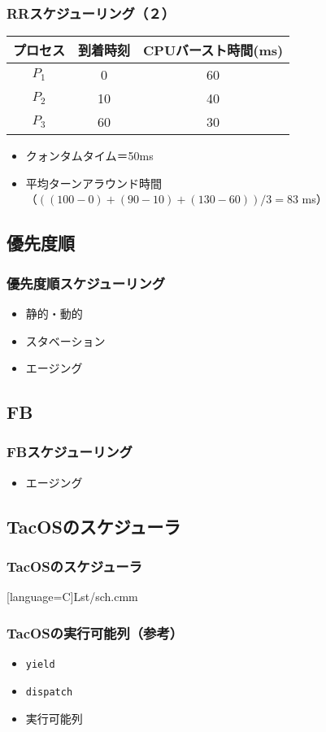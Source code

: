 \documentclass[dvipdfmx]{beamer}
\begin{document}
\begin{frame}
  \frametitle{RRスケジューリング（２）}
  \small\begin{tabular}{c c c}
    プロセス & 到着時刻 & CPUバースト時間(ms) \\
    \hline
    $P_1$    & 0  & 60 \\
    $P_2$    & 10 & 40 \\
    $P_3$    & 60 & 30 \\
  \end{tabular}
  \begin{itemize}
    \item クォンタムタイム＝50ms
    \item 平均ターンアラウンド時間\\
      （$((100-0)+(90-10)+(130-60))/3=83$ ms）
  \end{itemize}
\end{frame}

\subsection{優先度順}
\begin{frame}
  \frametitle{優先度順スケジューリング}
  \begin{itemize}
    \item 静的・動的
    \item スタベーション
    \item エージング
  \end{itemize}
\end{frame}


\subsection{FB}
\begin{frame}
  \frametitle{FBスケジューリング}
  \begin{itemize}
    \item エージング
  \end{itemize}
\end{frame}

\subsection{TacOSのスケジューラ}
\begin{frame}[fragile]
  \frametitle{TacOSのスケジューラ}
  
      [language={C}]{Lst/sch.cmm}
\end{frame}

\begin{frame}
  \frametitle{TacOSの実行可能列（参考）}
  \begin{itemize}
    \item {\tt yield}
    \item {\tt dispatch}
    \item 実行可能列
  \end{itemize}
\end{frame}
\end{document}
